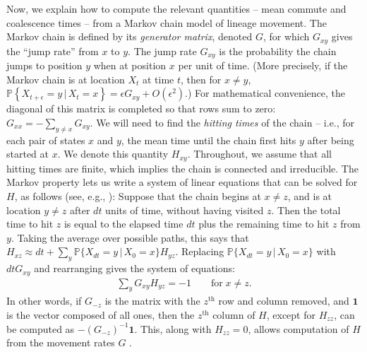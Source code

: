 \documentclass{article}
\renewcommand{\P}{\mathbb{P}}
\newcommand{\given}{\,\vert\,}
\newcommand{\PP}[1]{\P\!\left\{#1\right\}}
\newcommand{\bone}{\mathbf{1}}
\begin{document}
Now, we explain how to compute the relevant quantities --
mean commute and coalescence times -- from a Markov chain model of lineage movement.
The Markov chain is defined by its \emph{generator matrix}, denoted $G$,
for which $G_{xy}$ gives the ``jump rate'' from $x$ to $y$.
The jump rate $G_{xy}$ is 
the probability the chain jumps to position $y$ when at position $x$ per unit of time.
(More precisely, if the Markov chain is at location $X_t$ at time $t$,  
then for $x \neq y$, $\PP{X_{t+\epsilon} = y \given X_t = x} = \epsilon G_{xy} + O(\epsilon^2)$.)
For mathematical convenience, the diagonal of this matrix is completed so that rows sum to zero:
$G_{xx} = - \sum_{y \neq x} G_{xy}$.
We will need to find the \emph{hitting times} of the chain --
i.e., for each pair of states $x$ and $y$, 
the mean time until the chain first hits $y$ after being started at $x$.
We denote this quantity $H_{xy}$.
Throughout, we assume that all hitting times are finite,
which implies the chain is connected and irreducible.
The Markov property lets us write a system of linear equations that can be solved for $H$, as follows
(see, e.g., \citet{kemeny1983finite}):
Suppose that the chain begins at $x \neq z$,
and is at location $y \neq z$ after $dt$ units of time, without having visited $z$.
Then the total time to hit $z$ is equal to the elapsed time $dt$
plus the remaining time to hit $z$ from $y$.
Taking the average over possible paths, this says that 
$H_{xz} \approx dt + \sum_y \P\{X_{dt} = y \given X_0 = x\} H_{yz}$.
Replacing $\P\{X_{dt} = y \given X_0 = x\}$ with $dt G_{xy}$ and rearranging
gives the system of equations:
\begin{align} \label{eqn:hitting_sum}
    \sum_y G_{xy} H_{yz} = -1 \qquad \text{for} \; x \neq z.
\end{align}
In other words, if $G_{-z}$ is the matrix with the $z^\text{th}$ row and column removed,
and $\bone$ is the vector composed of all ones,
then the $z^\text{th}$ column of $H$, except for $H_{zz}$,
can be computed as $- (G_{-z})^{-1} \bone$.
This, along with $H_{zz} = 0$, allows computation of $H$
from the movement rates $G$ \citep{kemeny1983finite}.
\end{document}
